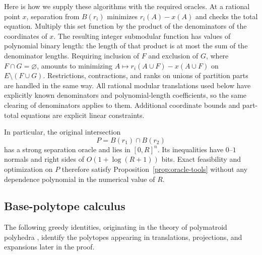 Here is how we supply these algorithms with the required oracles.
At a rational point $x$, separation from $B(r_i)$ minimizes
$r_i(A)-x(A)$ and checks the total equation.  Multiply this set function
by the product of the denominators of the coordinates of $x$.
The resulting integer submodular function has values of polynomial
binary length: the length of that product is at most the sum of the
denominator lengths.  Requiring inclusion of $F$ and exclusion of $G$,
where $F\cap G=\varnothing$, amounts to minimizing
$A\mapsto r_i(A\cup F)-x(A\cup F)$ on
$E\setminus(F\cup G)$.  Restrictions, contractions, and ranks on unions
of partition parts are handled in the same way.  All rational modular
translations used below have explicitly known denominators and
polynomial-length coefficients, so the same clearing of denominators
applies to them.  Additional coordinate bounds and part-total equations
are explicit linear constraints.

In particular, the original intersection
\begin{equation}\label{eq:original-polytope}
 P=B(r_1)\cap B(r_2)
\end{equation}
has a strong separation oracle and lies in $[0,R]^n$.  Its inequalities
have $0$--$1$ normals and right sides of $O(1+\log(R+1))$ bits.
Exact feasibility and optimization on $P$ therefore satisfy
Proposition~\ref{prop:oracle-tools} without any dependence polynomial
in the numerical value of $R$.

\subsection{Base-polytope calculus}

The following greedy identities, originating in the theory of
polymatroid polyhedra \cite{Edmonds1970}, identify the polytopes appearing
in translations, projections, and expansions later in the proof.

